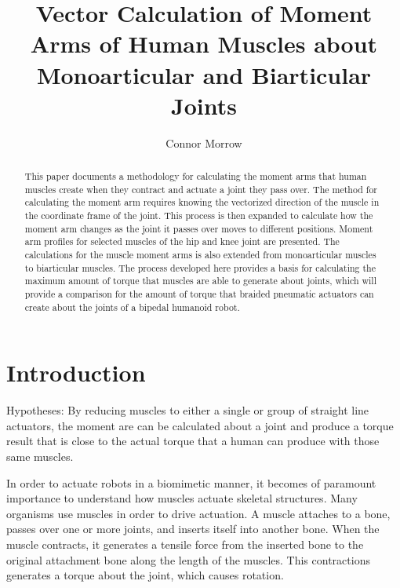 \documentclass[runningheads]{llncs}
\begin{document}
\title{Vector Calculation of Moment Arms of Human Muscles about Monoarticular and Biarticular Joints}

\author{Connor Morrow}


\maketitle              %
\begin{abstract}
This paper documents a methodology for calculating the moment arms that human muscles create when they contract and actuate a joint they pass over. The method for calculating the moment arm requires knowing the vectorized direction of the muscle in the coordinate frame of the joint. This process is then expanded to calculate how the moment arm changes as the joint it passes over moves to different positions. Moment arm profiles for selected muscles of the hip and knee joint are presented. The calculations for the muscle moment arms is also extended from monoarticular muscles to biarticular muscles. The process developed here provides a basis for calculating the maximum amount of torque that muscles are able to generate about joints, which will provide a comparison for the amount of torque that braided pneumatic actuators can create about the joints of a bipedal humanoid robot. 

\end{abstract}

\section{Introduction}
Hypotheses: By reducing muscles to either a single or group of straight line actuators, the moment are can be calculated about a joint and produce a torque result that is close to the actual torque that a human can produce with those same muscles.

In order to actuate robots in a biomimetic manner, it becomes of paramount importance to understand how muscles actuate skeletal structures. Many organisms use muscles in order to drive actuation. A muscle attaches to a bone, passes over one or more joints, and inserts itself into another bone. When the muscle contracts, it generates a tensile force from the inserted bone to the original attachment bone along the length of the muscles. This contractions generates a torque about the joint, which causes rotation. 
\end{document}
